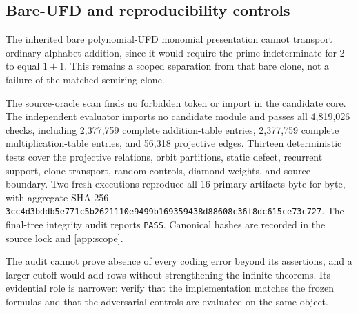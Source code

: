 \subsection{Bare-UFD and reproducibility controls}

The inherited bare polynomial-UFD monomial presentation cannot transport
ordinary alphabet addition, since it would require the prime indeterminate
for 2 to equal $1+1$.  This remains a scoped separation from that bare clone,
not a failure of the matched semiring clone.

The source-oracle scan finds no forbidden token or import in the candidate
core.  The independent evaluator imports no candidate module and passes all
4,819,026 checks, including 2,377,759 complete addition-table entries,
2,377,759 complete multiplication-table entries, and 56,318 projective
edges.  Thirteen deterministic tests cover the projective relations, orbit
partitions, static defect, recurrent support, clone transport, random
controls, diamond weights, and source boundary.  Two fresh executions
reproduce all 16 primary artifacts byte for byte, with aggregate SHA-256
\nolinkurl{3cc4d3bddb5e771c5b2621110e9499b169359438d88608c36f8dc615ce73c727}.
The final-tree integrity audit reports \texttt{PASS}.  Canonical hashes are
recorded in the source lock and \cref{app:scope}.

The audit cannot prove absence of every coding error beyond its assertions,
and a larger cutoff would add rows without strengthening the infinite
theorems.  Its evidential role is narrower: verify that the implementation
matches the frozen formulas and that the adversarial controls are evaluated
on the same object.
